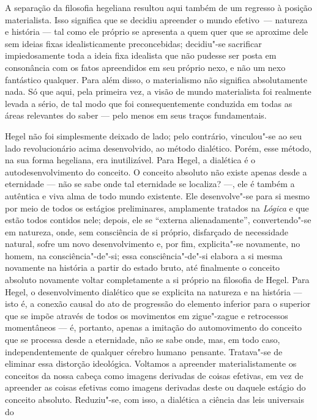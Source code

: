 A separação da filosofia hegeliana resultou aqui também de um regresso à
posição materialista. Isso significa que se decidiu apreender o mundo
efetivo\est\ --- natureza e história --- tal como ele próprio se apresenta a quem
quer que se aproxime dele sem ideias fixas
idealisticamente preconcebidas; decidiu"-se sacrificar impiedosamente
toda a ideia fixa idealista que não pudesse ser posta em consonância com
os fatos apreendidos em seu próprio nexo, e não um nexo fantástico
qualquer. Para além disso, o materialismo não significa absolutamente
nada. Só que aqui, pela primeira vez, a visão de mundo materialista foi
realmente levada a sério, de tal modo que foi consequentemente conduzida
em todas as áreas relevantes do saber --- pelo menos em seus traços
fundamentais.

Hegel não
foi simplesmente deixado de lado; pelo contrário, vinculou"-se ao seu
lado revolucionário acima desenvolvido, ao método dialético. Porém, esse
método, na sua forma hegeliana, era inutilizável.
Para Hegel,
a dialética é o autodesenvolvimento do conceito. O conceito absoluto não
existe apenas desde a eternidade --- não se sabe onde tal eternidade se localiza? ---, ele é também a
autêntica e viva alma de todo mundo existente. Ele desenvolve"-se para si
mesmo por meio de todos os estágios preliminares, amplamente tratados na
\emph{Lógica} e que estão todos contidos nele; depois, ele se ``externa
alienadamente'', convertendo"-se em natureza, onde, sem consciência de si
próprio, disfarçado de necessidade natural, sofre um novo
desenvolvimento e, por fim, explicita"-se novamente, no homem, na
consciência"-de"-si; essa consciência"-de"-si elabora a si mesma
novamente na história a partir do estado bruto, até
finalmente o conceito absoluto novamente voltar completamente a si
próprio na filosofia
de Hegel.
Para Hegel,
o desenvolvimento dialético que se explicita na natureza e na história ---
isto é, a conexão causal do ato de progressão do elemento inferior para
o superior que se impõe através de todos os movimentos em zigue"-zague e
retrocessos momentâneos --- é, portanto, apenas a imitação 
do automovimento do conceito que se processa desde a
eternidade, não se sabe onde, mas, em todo caso, independentemente de
qualquer cérebro humano\est\ pensante. Tratava"-se de eliminar essa distorção
ideológica. Voltamos a apreender materialistamente os conceitos da nossa
cabeça como imagens derivadas de coisas efetivas, em 
vez de apreender as coisas efetivas como imagens derivadas
deste ou daquele estágio do conceito absoluto. 
Reduziu"-se, com isso, a dialética a ciência das leis universais do
